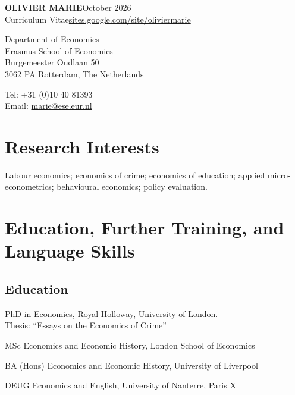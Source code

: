 \documentclass[11pt,a4paper]{article}
\newcommand{\cvdate}{October 2026}
\begin{document}
{\LARGE\bfseries\color{navy} OLIVIER MARIE}\hfill{\small\color{mid}\cvdate}\\[2pt]
{\large Curriculum Vitae}\hfill{\small\href{https://sites.google.com/site/oliviermarie/}{sites.google.com/site/oliviermarie}}

\vspace{8pt}
\begin{minipage}[t]{0.55\textwidth}
Department of Economics\\
Erasmus School of Economics\\
Burgemeester Oudlaan 50\\
3062 PA Rotterdam, The Netherlands
\end{minipage}%
\begin{minipage}[t]{0.45\textwidth}
Tel: +31 (0)10 40 81393\\
Email: \href{mailto:marie@ese.eur.nl}{marie@ese.eur.nl}
\end{minipage}

\section{Research Interests}
Labour economics; economics of crime; economics of education; applied micro-econometrics; behavioural economics; policy evaluation.

\section{Education, Further Training, and Language Skills}

\subsection{Education}
\begin{datelist}
  \item[2005 -- 2010] PhD in Economics, Royal Holloway, University of London.\\ Thesis: ``Essays on the Economics of Crime''
  \item[2000 -- 2001] MSc Economics and Economic History, London School of Economics
  \item[1998 -- 2000] BA (Hons) Economics and Economic History, University of Liverpool
  \item[1995 -- 1998] DEUG Economics and English, University of Nanterre, Paris X
\end{datelist}
\end{document}
